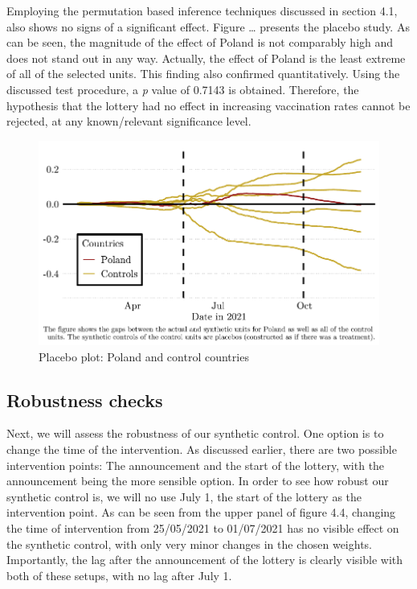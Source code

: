\documentclass{scrbook}
\begin{document}
Employing the permutation based inference techniques discussed in
section 4.1, also shows no signs of a significant effect. Figure
\ldots{} presents the placebo study. As can be seen, the magnitude of
the effect of Poland is not comparably high and does not stand out in
any way. Actually, the effect of Poland is the least extreme of all of
the selected units. This finding also confirmed quantitatively. Using
the discussed test procedure, a \textit{p} value of 0.7143 is obtained.
Therefore, the hypothesis that the lottery had no effect in increasing
vaccination rates cannot be rejected, at any known/relevant significance
level.

\begin{figure}[h]
\caption{Placebo plot: Poland and control countries}

\begin{center}\includegraphics{bachelor_thesis_files/figure-latex/unnamed-chunk-4-1} \end{center}
\end{figure}

\subsection*{Robustness checks}

Next, we will assess the robustness of our synthetic control. One option
is to change the time of the intervention. As discussed earlier, there
are two possible intervention points: The announcement and the start of
the lottery, with the announcement being the more sensible option. In
order to see how robust our synthetic control is, we will no use July 1,
the start of the lottery as the intervention point. As can be seen from
the upper panel of figure 4.4, changing the time of intervention from
25/05/2021 to 01/07/2021 has no visible effect on the synthetic control,
with only very minor changes in the chosen weights. Importantly, the lag
after the announcement of the lottery is clearly visible with both of
these setups, with no lag after July 1.
\end{document}
